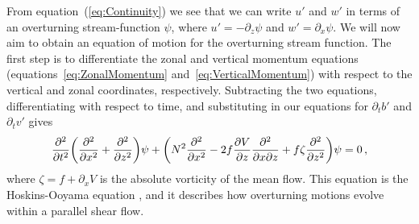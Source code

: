     From equation~(\ref{eq:Continuity}) we see that we can write $u'$ and $w'$ in terms of an overturning stream-function $\psi$, where $u' = - \partial_z \psi$ and $w' = \partial_x \psi$. We will now aim to obtain an equation of motion for the overturning stream function. The first step is to differentiate the zonal and vertical momentum equations (equations~\ref{eq:ZonalMomentum} and~\ref{eq:VerticalMomentum}) with respect to the vertical and zonal coordinates, respectively. Subtracting the two equations, differentiating with respect to time, and substituting in our equations for $\partial_t b'$ and $\partial_t v'$ gives
    \begin{equation}
    \label{eq:OriginalHoskins}
    \pdv[2]{}{t} \bigg(\pdv[2]{}{x} + \pdv[2]{}{z}\bigg) \psi + \bigg( N^2 \pdv[2]{}{x} - 2 f \pdv{V}{z} \pdv[2]{}{x}{z} + f \zeta \pdv[2]{}{z} \bigg) \psi = 0 \, ,
    \end{equation}
    where $\zeta = f + \partial_x V$ is the absolute vorticity of the mean flow. This equation is the Hoskins-Ooyama equation \citep{Ooyama1966, Hoskins1974}, and it describes how overturning motions evolve within a parallel shear flow.
    
